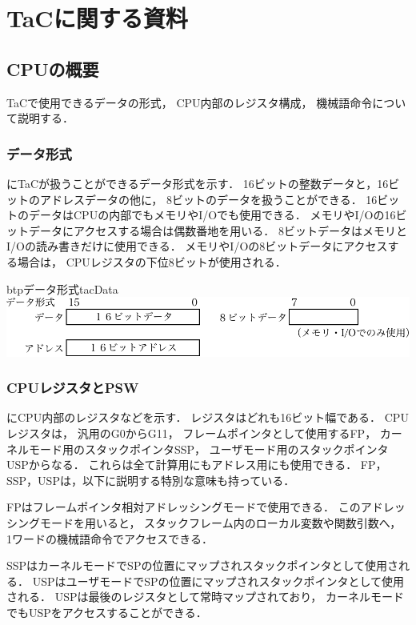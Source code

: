 \chapter{TaCに関する資料}
\label{appTac}

\section{CPUの概要}
TaCで使用できるデータの形式，
CPU内部のレジスタ構成，
機械語命令について説明する．

\subsection{データ形式}
にTaCが扱うことができるデータ形式を示す．
16ビットの整数データと，16ビットのアドレスデータの他に，
8ビットのデータを扱うことができる．
16ビットのデータはCPUの内部でもメモリやI/Oでも使用できる．
メモリやI/Oの16ビットデータにアクセスする場合は偶数番地を用いる．
8ビットデータはメモリとI/Oの読み書きだけに使用できる．
メモリやI/Oの8ビットデータにアクセスする場合は，
CPUレジスタの下位8ビットが使用される．

\begin{myfig}{btp}{データ形式}{tacData}
  \includegraphics[scale=0.7]{Tbl/TaC7a-instruction-p1-1-crop.pdf}
\end{myfig}

\subsection{CPUレジスタとPSW}
にCPU内部のレジスタなどを示す．
レジスタはどれも16ビット幅である．
CPUレジスタは，
汎用のG0からG11，
フレームポインタとして使用するFP，
カーネルモード用のスタックポインタSSP，
ユーザモード用のスタックポインタUSPからなる．
これらは全て計算用にもアドレス用にも使用できる．
FP，SSP，USPは，以下に説明する特別な意味も持っている．

FPはフレームポインタ相対アドレッシングモードで使用できる．
このアドレッシングモードを用いると，
スタックフレーム内のローカル変数や関数引数へ，
1ワードの機械語命令でアクセスできる．

SSPはカーネルモードでSPの位置にマップされスタックポインタとして使用される．
USPはユーザモードでSPの位置にマップされスタックポインタとして使用される．
USPは最後のレジスタとして常時マップされており，
カーネルモードでもUSPをアクセスすることができる．

